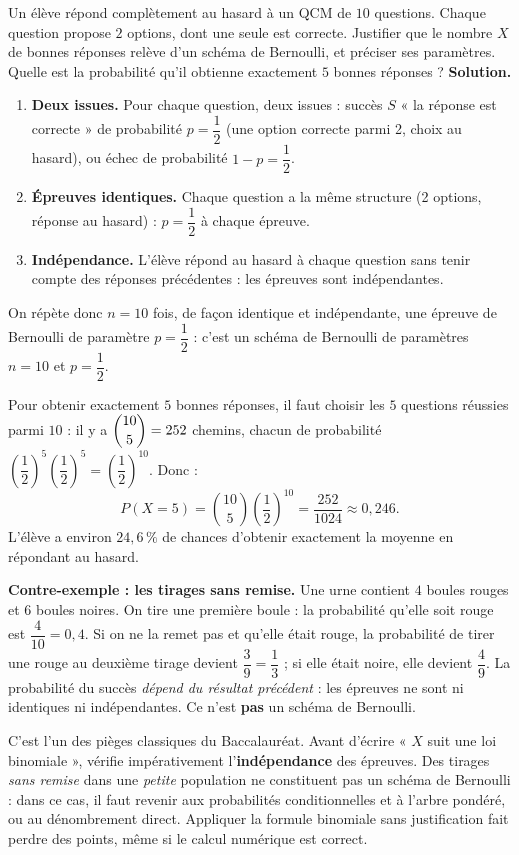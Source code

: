 \documentclass[11pt]{article}
\begin{document}
\begin{exoresolu}
Un élève répond complètement au hasard à un QCM de $10$ questions. Chaque question propose $2$ options, dont une seule est correcte. Justifier que le nombre $X$ de bonnes réponses relève d'un schéma de Bernoulli, et préciser ses paramètres. Quelle est la probabilité qu'il obtienne exactement $5$ bonnes réponses ?
\tcblower
\textbf{Solution.}
\begin{enumerate}
\item \textbf{Deux issues.} Pour chaque question, deux issues : succès $S$ « la réponse est correcte » de probabilité $p = \dfrac{1}{2}$ (une option correcte parmi 2, choix au hasard), ou échec de probabilité $1-p = \dfrac{1}{2}$.
\item \textbf{Épreuves identiques.} Chaque question a la même structure (2 options, réponse au hasard) : $p = \dfrac{1}{2}$ à chaque épreuve.
\item \textbf{Indépendance.} L'élève répond au hasard à chaque question sans tenir compte des réponses précédentes : les épreuves sont indépendantes.
\end{enumerate}
On répète donc $n = 10$ fois, de façon identique et indépendante, une épreuve de Bernoulli de paramètre $p = \dfrac{1}{2}$ : c'est un schéma de Bernoulli de paramètres $n = 10$ et $p = \dfrac{1}{2}$.

Pour obtenir exactement $5$ bonnes réponses, il faut choisir les $5$ questions réussies parmi $10$ : il y a $\dbinom{10}{5} = 252$ chemins, chacun de probabilité $\left(\dfrac{1}{2}\right)^{5}\left(\dfrac{1}{2}\right)^{5} = \left(\dfrac{1}{2}\right)^{10}$. Donc :
\[ P(X = 5) = \binom{10}{5}\left(\frac{1}{2}\right)^{10} = \frac{252}{1024} \approx 0{,}246. \]
L'élève a environ $24,6\,\%$ de chances d'obtenir exactement la moyenne en répondant au hasard.
\end{exoresolu}

\textbf{Contre-exemple : les tirages sans remise.} Une urne contient $4$ boules rouges et $6$ boules noires. On tire une première boule : la probabilité qu'elle soit rouge est $\dfrac{4}{10} = 0{,}4$. Si on ne la remet pas et qu'elle était rouge, la probabilité de tirer une rouge au deuxième tirage devient $\dfrac{3}{9} = \dfrac{1}{3}$ ; si elle était noire, elle devient $\dfrac{4}{9}$. La probabilité du succès \emph{dépend du résultat précédent} : les épreuves ne sont ni identiques ni indépendantes. Ce n'est \textbf{pas} un schéma de Bernoulli.

\begin{attention}
C'est l'un des pièges classiques du Baccalauréat. Avant d'écrire « $X$ suit une loi binomiale », vérifie impérativement l'\textbf{indépendance} des épreuves. Des tirages \emph{sans remise} dans une \emph{petite} population ne constituent pas un schéma de Bernoulli : dans ce cas, il faut revenir aux probabilités conditionnelles et à l'arbre pondéré, ou au dénombrement direct. Appliquer la formule binomiale sans justification fait perdre des points, même si le calcul numérique est correct.
\end{attention}
\end{document}
